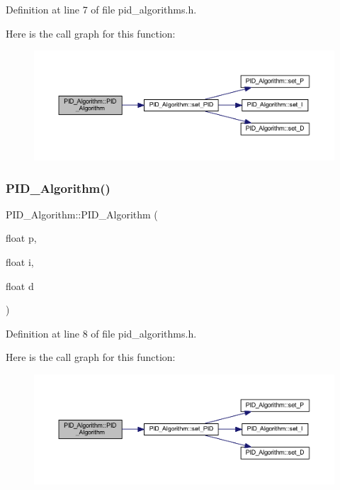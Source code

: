Definition at line 7 of file pid\+\_\+algorithms.\+h.

Here is the call graph for this function\+:
\nopagebreak
\begin{figure}[H]
\begin{center}
\leavevmode
\includegraphics[width=350pt]{class_p_i_d___algorithm_a77e1b4df4f9605df9373deb336c47987_cgraph}
\end{center}
\end{figure}
\mbox{\label{class_p_i_d___algorithm_afa89df608678228c8ecbb73c5953d0b4}} 
\subsubsection{\texorpdfstring{PID\_Algorithm()}{PID\_Algorithm()}\hspace{0.1cm}{\footnotesize\ttfamily [2/2]}}
{\footnotesize\ttfamily P\+I\+D\+\_\+\+Algorithm\+::\+P\+I\+D\+\_\+\+Algorithm (\begin{DoxyParamCaption}\item[{float}]{p,  }\item[{float}]{i,  }\item[{float}]{d }\end{DoxyParamCaption})\hspace{0.3cm}{\ttfamily [inline]}}



Definition at line 8 of file pid\+\_\+algorithms.\+h.

Here is the call graph for this function\+:
\nopagebreak
\begin{figure}[H]
\begin{center}
\leavevmode
\includegraphics[width=350pt]{class_p_i_d___algorithm_afa89df608678228c8ecbb73c5953d0b4_cgraph}
\end{center}
\end{figure}
\mbox{\label{class_p_i_d___algorithm_ad6a88132e10c378e7ebe9959898278e6}} 
